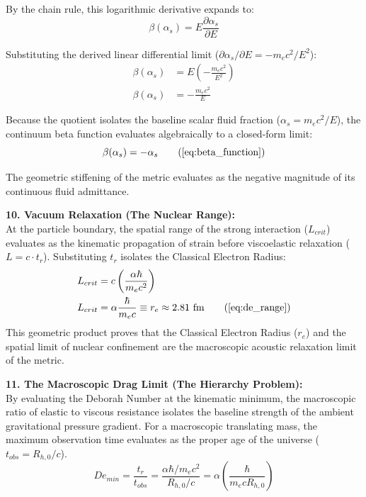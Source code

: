 \documentclass[11pt, a4paper]{article}
\begin{document}
By the chain rule, this logarithmic derivative expands to:
\begin{equation}
    \beta(\alpha_s) = E \frac{\partial \alpha_s}{\partial E}
\end{equation}

Substituting the derived linear differential limit ($\partial \alpha_s / \partial E = - m_e c^2 / E^2$):
\begin{align}
    \beta(\alpha_s) &= E \left( - \frac{m_e c^2}{E^2} \right) \\
    \beta(\alpha_s) &= - \frac{m_e c^2}{E}
\end{align}

Because the quotient isolates the baseline scalar fluid fraction ($\alpha_s = m_e c^2 / E$), the continuum beta function evaluates algebraically to a closed-form limit:
\begin{equation}
    \beta(\alpha_s) = - \alpha_s \tag{\ref{eq:beta_function}}
\end{equation}

The geometric stiffening of the metric evaluates as the negative magnitude of its continuous fluid admittance. 

\textbf{10. Vacuum Relaxation (The Nuclear Range):} \\
At the particle boundary, the spatial range of the strong interaction ($L_{crit}$) evaluates as the kinematic propagation of strain before viscoelastic relaxation ($L = c \cdot t_r$). Substituting $t_r$ isolates the Classical Electron Radius:
\begin{align}
    L_{crit} &= c \left( \frac{\alpha \hbar}{m_e c^2} \right) \\
    L_{crit} &= \alpha \frac{\hbar}{m_e c} \equiv r_e \approx 2.81 \text{ fm} \tag{\ref{eq:de_range}}
\end{align}
This geometric product proves that the Classical Electron Radius ($r_e$) and the spatial limit of nuclear confinement are the macroscopic acoustic relaxation limit of the metric.

\textbf{11. The Macroscopic Drag Limit (The Hierarchy Problem):} \\
By evaluating the Deborah Number at the kinematic minimum, the macroscopic ratio of elastic to viscous resistance isolates the baseline strength of the ambient gravitational pressure gradient. For a macroscopic translating mass, the maximum observation time evaluates as the proper age of the universe ($t_{obs} = R_{h,0} / c$).
\begin{equation}
    De_{min} = \frac{t_r}{t_{obs}} = \frac{\alpha \hbar / m_e c^2}{R_{h,0} / c} = \alpha \left( \frac{\hbar}{m_e c R_{h,0}} \right)
\end{equation}
\end{document}
